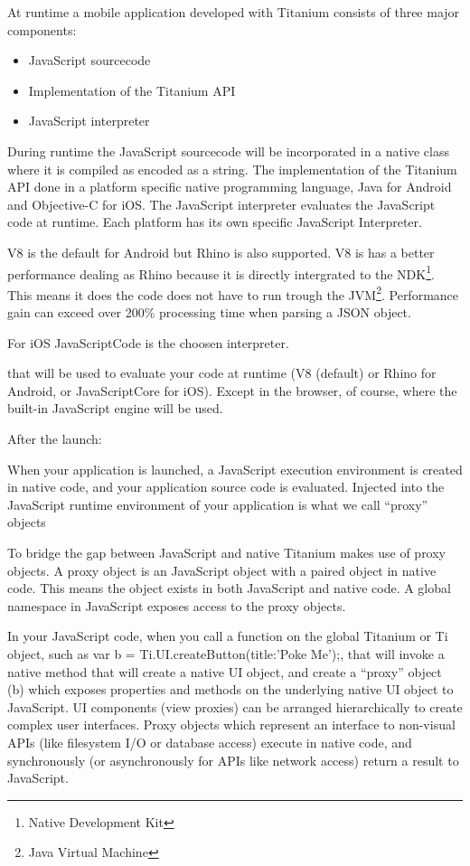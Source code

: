 
At runtime a mobile application developed with Titanium consists of three major components:
\begin{itemize}
	\item
	JavaScript sourcecode
	\item
	Implementation of the Titanium API
	\item
	JavaScript interpreter
\end{itemize}

During runtime the JavaScript sourcecode will be incorporated in a native class where it is compiled as encoded as a string. The implementation of the Titanium API done in a platform specific native programming language, Java for Android and Objective-C for iOS. The JavaScript interpreter evaluates the JavaScript code at runtime. Each platform has its own specific JavaScript Interpreter.

V8 is the default for Android but Rhino is also supported. V8 is has a better performance dealing as Rhino because it is directly intergrated to the NDK\footnote{Native Development Kit}. This means it does the code does not have to run trough the JVM\footnote{Java Virtual Machine}. Performance gain can exceed over 200\% processing time when parsing a JSON object.\cite{Lukasavage2011}

For iOS JavaScriptCode is the choosen interpreter.


 that will be used to evaluate your code at runtime (V8 (default) or Rhino for Android, or JavaScriptCore for iOS). Except in the browser, of course, where the built-in JavaScript engine will be used.

After the launch:

When your application is launched, a JavaScript execution environment is created in native code, and your application source code is evaluated. Injected into the JavaScript runtime environment of your application is what we call “proxy” objects

\cite{Whinnery2012}

To bridge the gap between JavaScript and native Titanium makes use of proxy objects. A proxy object is an JavaScript object with a paired object in native code. 
\cite{Whinnery2012} This means the object exists in both JavaScript and native code. A global namespace in JavaScript exposes access to the proxy objects.

In your JavaScript code, when you call a function on the global Titanium or Ti object, such as var b = Ti.UI.createButton({title:'Poke Me'});, that will invoke a native method that will create a native UI object, and create a “proxy” object (b) which exposes properties and methods on the underlying native UI object to JavaScript.
UI components (view proxies) can be arranged hierarchically to create complex user interfaces. Proxy objects which represent an interface to non-visual APIs (like filesystem I/O or database access) execute in native code, and synchronously (or asynchronously for APIs like network access) return a result to JavaScript. 

